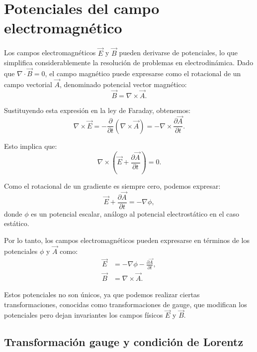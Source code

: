 \documentclass[12pt,a4paper]{book}
\begin{document}
\section{Potenciales del campo electromagnético}

Los campos electromagnéticos $\vec{E}$ y $\vec{B}$ pueden derivarse de potenciales, lo que simplifica considerablemente la resolución de problemas en electrodinámica. Dado que $\nabla \cdot \vec{B} = 0$, el campo magnético puede expresarse como el rotacional de un campo vectorial $\vec{A}$, denominado potencial vector magnético:
\begin{equation}
\vec{B} = \nabla \times \vec{A}.
\end{equation}

Sustituyendo esta expresión en la ley de Faraday, obtenemos:
\begin{equation}
\nabla \times \vec{E} = -\frac{\partial}{\partial t}(\nabla \times \vec{A}) = -\nabla \times \frac{\partial \vec{A}}{\partial t}.
\end{equation}

Esto implica que:
\begin{equation}
\nabla \times \left(\vec{E} + \frac{\partial \vec{A}}{\partial t}\right) = 0.
\end{equation}

Como el rotacional de un gradiente es siempre cero, podemos expresar:
\begin{equation}
\vec{E} + \frac{\partial \vec{A}}{\partial t} = -\nabla \phi,
\end{equation}
donde $\phi$ es un potencial escalar, análogo al potencial electrostático en el caso estático.

Por lo tanto, los campos electromagnéticos pueden expresarse en términos de los potenciales $\phi$ y $\vec{A}$ como:
\begin{align}
\vec{E} &= -\nabla \phi - \frac{\partial \vec{A}}{\partial t}, \\
\vec{B} &= \nabla \times \vec{A}.
\end{align}

Estos potenciales no son únicos, ya que podemos realizar ciertas transformaciones, conocidas como transformaciones de gauge, que modifican los potenciales pero dejan invariantes los campos físicos $\vec{E}$ y $\vec{B}$.

\subsection{Transformación gauge y condición de Lorentz}
\end{document}

